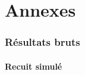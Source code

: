 \part*{Annexes}

\stopcontents

\startcontents[sections]

\setcounter{section}{0}

\newpage

\section{Résultats bruts}

\subsection{Recuit simulé}



\newpage


%
%  
